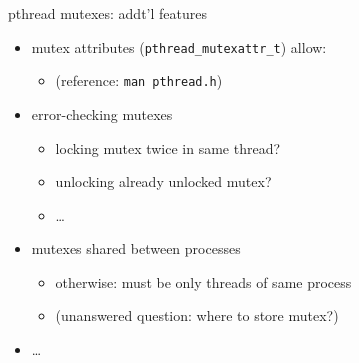 
\begin{frame}[fragile,label=mutexAttrFeatures]{pthread mutexes: addt'l features}
\begin{itemize}
\item mutex attributes (\texttt{pthread\_mutexattr\_t}) allow:
    \begin{itemize}
    \item (reference: \texttt{man pthread.h})
    \end{itemize}
\vspace{.5cm}
\item error-checking mutexes
    \begin{itemize}
    \item locking mutex twice in same thread?
    \item unlocking already unlocked mutex?
    \item \ldots
    \end{itemize}
\item mutexes shared between processes
    \begin{itemize}
    \item otherwise: must be only threads of same process
    \item (unanswered question: where to store mutex?)
    \end{itemize}
\item \ldots
\end{itemize}
\end{frame}
